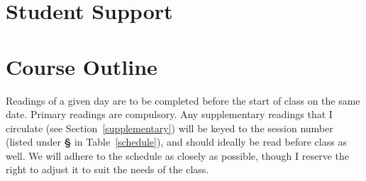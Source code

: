 \documentclass[titlepage]{article}
\begin{document}




\section{Student Support}
\label{support}




\section{Course Outline}
\label{outline}

Readings of a given day are to be completed before the start of class
on the same date. Primary readings are compulsory. Any supplementary
readings that I circulate (see Section~\ref{supplementary}) will
be keyed to the session number (listed under \textbf{\S} in
Table~\ref{schedule}), and should ideally be read before class as well.
We will adhere to the schedule as closely as possible, though I reserve
the right to adjust it to suit the needs of the class.

\newcommand\threebyten{\addfontfeatures{Numbers=Lining}3\,{\char"00D7}\,10}
\newcommand\Yhwh{\textsc{Yhwh}}
\newcommand\yhwh{\textsc{yhwh}}
\newcommand\ivy{\addfontfeatures{RawFeature=+ornm}•}
\end{document}
